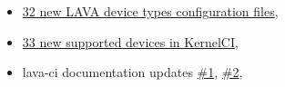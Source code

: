 \begin{itemize}
  \item \href{https://review.linaro.org/#/q/Quentin\%20Schulz}{32 new LAVA device types configuration files},
  \item \href{https://github.com/kernelci/lava-ci/commits/master?author=quentin.schulz\%40free-electrons.com&page=1}{33 new supported devices in KernelCI},
  \item lava-ci documentation updates \href{https://github.com/kernelci/lava-ci/commit/058e9a72a752c9851c16a96aa51beafc9ce80128}{\#1}, \href{https://github.com/kernelci/lava-ci/pull/56}{\#2},
\end{itemize}
